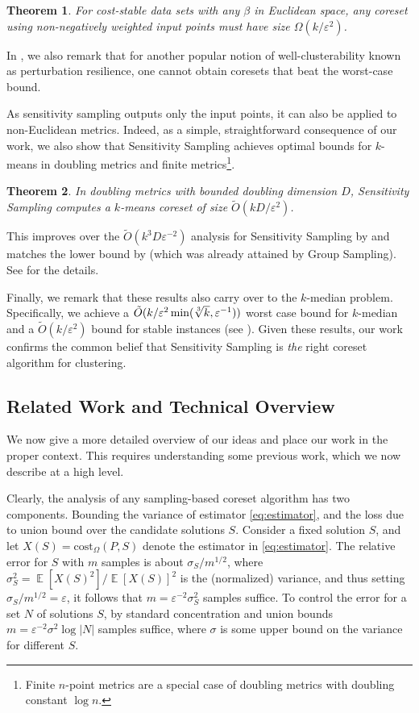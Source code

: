 \documentclass[11pt]{article}
\newtheorem{theorem}{Theorem}
\theoremstyle{restate}
\theoremstyle{definition}
\newcommand{\eps}{\ensuremath{\varepsilon}}
\newcommand{\E}{\mathop{\mathbb{E}}}
\begin{document}
\begin{theorem}
For cost-stable data sets with any $\beta$ in Euclidean space, any coreset using non-negatively weighted input points must have size $\Omega(k/\varepsilon^2)$.
\end{theorem}


In , we also remark that for another popular notion of well-clusterability known as perturbation resilience, one cannot obtain coresets that beat the worst-case bound. 

As sensitivity sampling outputs only the input points, it can also be applied to non-Euclidean metrics. Indeed, as a simple, straightforward consequence of our work, we also show that Sensitivity Sampling achieves optimal bounds for $k$-means in doubling metrics and finite metrics\footnote{
Finite $n$-point metrics are a special case of doubling metrics with doubling constant $\log n$.}.
\begin{theorem}\label{thm:doubling}
In doubling metrics with bounded doubling dimension $D$, Sensitivity Sampling computes a $k$-means coreset of size $\tilde{O}(kD/\varepsilon^2)$.
\end{theorem}
This improves over the $\tilde{O}(k^3D \varepsilon^{-2})$ analysis for Sensitivity Sampling by \cite{HuangJLW18} and matches the lower bound by \cite{CGSS22} (which was already attained by Group Sampling). See  for the details.

Finally, we remark that these results also carry over to the $k$-median problem.  
Specifically, we achieve a $\Tilde{O}(k/\varepsilon^{2}\min(\sqrt[3]{k},\varepsilon^{-1}))$ worst case bound for $k$-median and a $\tilde{O}(k/\varepsilon^2)$ bound for stable instances (see ). Given these results, our work confirms the common belief that Sensitivity Sampling is {\em the} right coreset algorithm for clustering. 




\subsection{Related Work and Technical Overview}
\label{sec:overview}
We now give a more detailed overview of our ideas and place our work in the proper context. This requires understanding some previous work, which we now describe at a high level.

Clearly, the analysis of any sampling-based coreset algorithm has two components. Bounding the variance of estimator \eqref{eq:estimator}, and the loss due to union bound over the candidate solutions $S$. 
Consider a fixed solution $S$, and let $X(S) =  \text{cost}_\Omega(P,S)$ denote the estimator in \eqref{eq:estimator}.
The relative error for $S$ with $m$ samples is about $\sigma_S/m^{1/2}$, where $\sigma_S^2 = \E[X(S)^2]/\E[X(S)]^2$ is the (normalized) variance, and thus setting $\sigma_S/m^{1/2} = \eps$, it follows that $m=  \eps^{-2}\sigma_S^2$ samples suffice.
To control the error for a set $N$ of solutions $S$, by standard concentration and union bounds $m = \eps^{-2} \sigma^2 \log |N|$ samples suffice, where $\sigma$ is some upper bound on the variance for different $S$.   
\end{document}
